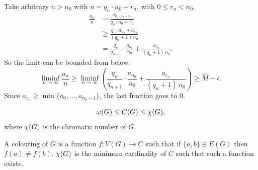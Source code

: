 Take arbitrary $n > n_0$ with $n = q_n \cdot n_0 + r_n$, with $0 \le r_n < n_0$.
\begin{align*}
	\frac{a_n}{n}
	& =
	\frac{a_{q_n \cdot n_0 +r_n}}{q_n \cdot n_0 +r_n}
	\\
	& \ge
	\frac{q_n \cdot a_{n_0} + a_{r_n}}{(q_n+1) \, n_0}
	\\
	& =
	\frac{q_n}{q_{n+1}} \cdot
	\frac{a_{n_0}}{n_0} +
	\frac{a_{r_n}}{(q_n + 1) \, n_0}.
\end{align*}
So the limit can be bounded from below:
\begin{equation*}
	\liminf_{n \to \infty} \frac{a_n}{n} \ge
	\liminf_{n \to \infty} \left(
		\frac{q_n}{q_{n+1}} \cdot \frac{a_{n_0}}{n_0} +
		\frac{a_{r_n}}{(q_n + 1) \, n_0}
	\right) \ge
	\hat{M} - \epsilon.
\end{equation*}
Since $a_{r_n} \ge \min \{a_0, \dots,a_{n_0 -1}\}$, the last fraction goes to 0.

\begin{prop}
	\begin{equation*}
		\omega(G) \leq C(G) \leq \chi(G),
	\end{equation*}
	where $\chi(G)$ is the chromatic number of $G$.
\end{prop}

A colouring of $G$ is a function $f : V(G) \to C$ such that if $\{a, b\} \in E(G)$ then $f(a) \neq f(b)$.
$\chi(G)$ is the minimum cardinality of $C$ such that such a function exists.

